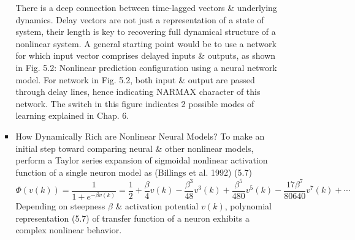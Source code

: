 \documentclass{article}
\begin{document}
\begin{enumerate}
\begin{itemize}
\begin{itemize}
			There is a deep connection between time-lagged vectors \& underlying dynamics. Delay vectors are not just a representation of a state of system, their length is key to recovering full dynamical structure of a nonlinear system. A general starting point would be to use a network for which input vector comprises delayed inputs \& outputs, as shown in {\sf Fig. 5.2: Nonlinear prediction configuration using a neural network model}. For network in Fig. 5.2, both input \& output are passed through delay lines, hence indicating NARMAX character of this network. The switch in this figure indicates 2 possible modes of learning explained in Chap. 6.
			\item {\sf How Dynamically Rich are Nonlinear Neural Models?} To make an initial step toward comparing neural \& other nonlinear models, perform a Taylor series expansion of sigmoidal nonlinear activation function of a single neuron model as (Billings et al. 1992) (5.7)
			\begin{equation}
				\Phi(v(k)) = \frac{1}{1 + e^{-\beta v(k)}} = \frac{1}{2} + \frac{\beta}{4}v(k) - \frac{\beta^3}{48}v^3(k) + \frac{\beta^5}{480}v^5(k) - \frac{17\beta^7}{80640}v^7(k) + \cdots
			\end{equation}
			Depending on steepness $\beta$ \& activation potential $v(k)$, polynomial representation (5.7) of transfer function of a neuron exhibits a complex nonlinear behavior.
			

\end{itemize}
\end{itemize}
\end{enumerate}
\end{document}
